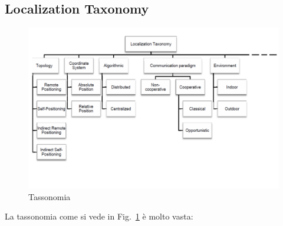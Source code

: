         \subsection{Localization Taxonomy}\label{subsec3.3}
        \begin{figure}
                \centering
                \includegraphics[scale=0.5]{fig1-lec3pt1.png}
                \caption{Tassonomia}
                \label{fig:fig1-lec3pt1}
        \end{figure}
        La tassonomia come si vede in Fig.~\ref{fig:fig1-lec3pt1} è molto vasta:

